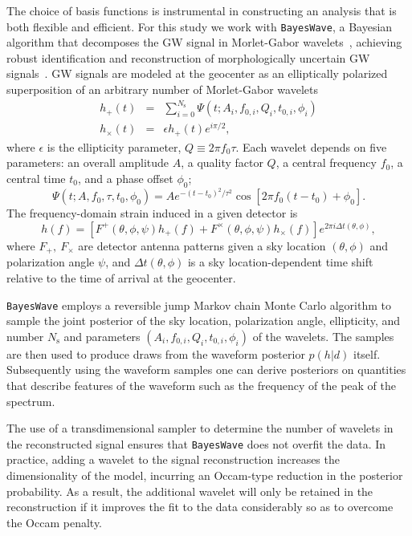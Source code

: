\documentclass[aps,prd,amsmath,floats,floatfix, twocolumn,
superscriptaddress,nofootinbib,showpacs]{revtex4-1}
\begin{document}
The choice of basis functions is instrumental in constructing an analysis that is both flexible and efficient. For this study we work with {\tt BayesWave}, a Bayesian algorithm that decomposes the GW signal in Morlet-Gabor wavelets~\cite{Cornish:2014kda,Littenberg:2014oda}, achieving robust identification and reconstruction of morphologically uncertain GW signals~\cite{Littenberg:2015kpb,2016PhRvD..93b2002K,Becsy:2016ofp,PhysRevD.93.122004}. GW signals are modeled at the geocenter as an elliptically polarized superposition of an arbitrary number of Morlet-Gabor wavelets
%
\begin{eqnarray}
h_+(t) & = & \sum_{i=0}^{N_{\mathrm{s}}} \Psi(t; A_i, f_{0,i}, Q_i, t_{0,i},\phi_i)\nonumber \\
h_{\times}(t) & = & \epsilon h_+(t) e^{i\pi/2},
\end{eqnarray}
%
where $\epsilon$ is the ellipticity parameter, $Q\equiv 2\pi f_0 \tau$. Each wavelet depends on five parameters: an overall amplitude $A$, a quality factor $Q$, a central frequency $f_0$, a central time $t_0$, and a phase offset $\phi_0$; 
%
\begin{equation}
\Psi(t; A, f_{0}, \tau, t_{0},\phi_0) = A e^{-(t-t_0)^2/\tau^2} \cos{[2\pi f_0(t\!-\!t_0)\!+\!\phi_0]}.
\end{equation}
%
The frequency-domain strain induced in a given detector is
%
\begin{equation}
h(f) = \left[F^+(\theta, \phi, \psi) h_+(f) + F^{\times} (\theta, \phi, \psi) h_{\times}(f)\right]e^{2\pi i \Delta t(\theta, \phi)},
\end{equation}
%
where $F_{+},~F_{\times}$ are detector antenna patterns given a sky location $(\theta,\phi)$ and polarization angle $\psi$, and $\Delta t(\theta, \phi)$ is a sky location-dependent time shift relative to the time of arrival at the geocenter.

{\tt BayesWave} employs a reversible jump Markov chain Monte Carlo algorithm to sample the joint posterior of the sky location, polarization angle, ellipticity, and number $N_{\mathrm{s}}$ and parameters $(A_i, f_{0,i}, Q_i, t_{0,i},\phi_i)$ of the wavelets. The samples are then used to produce draws from the waveform posterior $p(h|d)$ itself. Subsequently using the waveform samples one can derive posteriors on quantities that describe features of the waveform such as the frequency of the peak of the spectrum.

The use of a transdimensional sampler to determine the number of wavelets in the reconstructed signal ensures that {\tt BayesWave} does not overfit the data. In practice, adding a wavelet to the signal reconstruction increases the dimensionality of the model, incurring an Occam-type reduction in the posterior probability. As a result, the additional wavelet will only be retained in the reconstruction if it improves the fit to the data considerably so as to overcome the Occam penalty.
\end{document}
